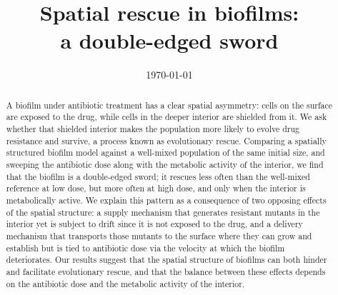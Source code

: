 \documentclass[11pt]{article}
\title{Spatial rescue in biofilms:\\
a double-edged sword}
\author{}
\date{\today}
\begin{document}
\maketitle

\begin{abstract}
\noindent A biofilm under antibiotic treatment has a clear spatial
asymmetry: cells on the surface are exposed to the drug, while cells
in the deeper interior are shielded from it. We ask whether that
shielded interior makes the population more likely to evolve drug
resistance and survive, a process known as evolutionary rescue.
Comparing a spatially structured biofilm model against a well-mixed
population of the same initial size, and sweeping the antibiotic dose
along with the metabolic activity of the interior, we find that the
biofilm is a double-edged sword; it rescues less often than
the well-mixed reference at low dose, but more often at high dose,
and only when the interior is metabolically active. We explain this pattern as a consequence of two opposing effects of the spatial structure: a supply mechanism that generates resistant mutants in the interior yet is subject to drift since it is not exposed to the drug, and a delivery mechanism that transports those mutants to the surface where they can grow and establish but is tied to antibiotic dose via the velocity at which the biofilm deteriorates. Our results suggest that the spatial structure of biofilms can both hinder and facilitate evolutionary rescue, and that the balance between these effects depends on the antibiotic dose and the metabolic activity of the interior.

\end{abstract}









\end{document}
